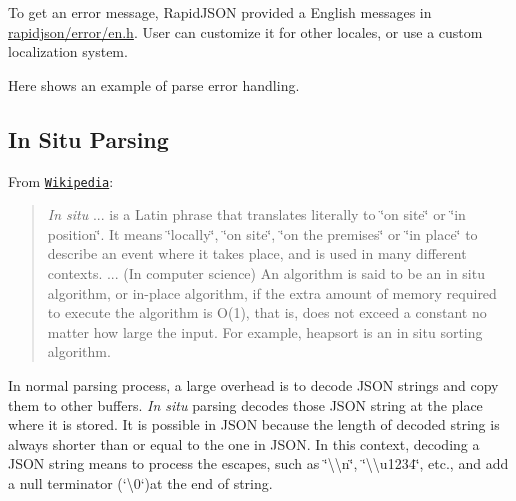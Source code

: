 To get an error message, Rapid\+J\+S\+ON provided a English messages in {\ttfamily \hyperlink{en_8h_source}{rapidjson/error/en.\+h}}. User can customize it for other locales, or use a custom localization system.

Here shows an example of parse error handling.


\hypertarget{md_Commun_Externe_RapidJSON_doc_dom.zh-cn_InSituParsing}{}\subsection{In Situ Parsing}\label{md_Commun_Externe_RapidJSON_doc_dom.zh-cn_InSituParsing}
From \href{http://en.wikipedia.org/wiki/In_situ}{\tt Wikipedia}\+:

\begin{quote}
{\itshape In situ} ... is a Latin phrase that translates literally to \char`\"{}on site\char`\"{} or \char`\"{}in position\char`\"{}. It means \char`\"{}locally\char`\"{}, \char`\"{}on site\char`\"{}, \char`\"{}on the premises\char`\"{} or \char`\"{}in place\char`\"{} to describe an event where it takes place, and is used in many different contexts. ... (In computer science) An algorithm is said to be an in situ algorithm, or in-\/place algorithm, if the extra amount of memory required to execute the algorithm is O(1), that is, does not exceed a constant no matter how large the input. For example, heapsort is an in situ sorting algorithm. \end{quote}


In normal parsing process, a large overhead is to decode J\+S\+ON strings and copy them to other buffers. {\itshape In situ} parsing decodes those J\+S\+ON string at the place where it is stored. It is possible in J\+S\+ON because the length of decoded string is always shorter than or equal to the one in J\+S\+ON. In this context, decoding a J\+S\+ON string means to process the escapes, such as {\ttfamily \char`\"{}\textbackslash{}\textbackslash{}n\char`\"{}}, {\ttfamily \char`\"{}\textbackslash{}\textbackslash{}u1234\char`\"{}}, etc., and add a null terminator (`\textquotesingle{}\textbackslash{}0\textquotesingle{}`)at the end of string.

